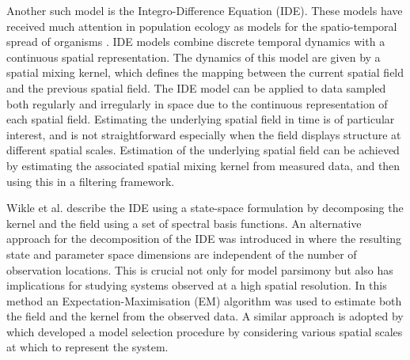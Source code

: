 \documentclass[draftcls,onecolumn]{IEEEtran}
\begin{document}
Another such model is the Integro-Difference Equation (IDE). These models have received much attention in population ecology as models for the spatio-temporal spread of organisms \cite{Kot1992,Kot1996}. IDE models combine discrete temporal dynamics with a continuous spatial representation. The dynamics of this model are given by a spatial mixing kernel, which defines the mapping between the current spatial field and the previous spatial field. The IDE model can be applied to data sampled both regularly and irregularly in space due to the continuous representation of each spatial field. Estimating the underlying spatial field in time is of particular interest, and is not straightforward especially when the field displays structure at different spatial scales. Estimation of the underlying spatial field can be achieved by estimating the associated spatial mixing kernel from measured data, and then using this in a filtering framework. 


Wikle et al. \cite{Wikle2002} describe the IDE using a state-space formulation by decomposing the kernel and the field using a set of spectral basis functions. An alternative approach for the decomposition of the IDE was introduced in \cite{Dewar2009} where the resulting state and parameter space dimensions are independent of the number of observation locations. This is crucial not only for model parsimony but also has implications for studying systems observed at a high spatial resolution. In this method an Expectation-Maximisation (EM)  algorithm  was used to estimate both the field and the kernel from the observed data. A similar approach is adopted by \cite{Scerri2009} which developed a model selection procedure by considering various spatial scales at which to represent the system. %

\end{document}
